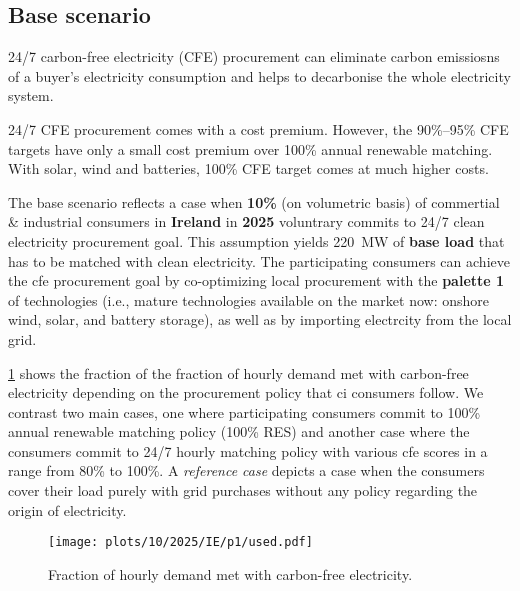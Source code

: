 \subsection{Base scenario}
\label{subsec:base}

\vspace{10pt}
\begin{res}
    24/7 carbon-free electricity (CFE) procurement can eliminate carbon emissiosns of a buyer's electricity consumption and helps to decarbonise the whole electricity system.
\end{res}

\vspace{5pt}
\begin{res}
    24/7 CFE procurement comes with a cost premium. 
    However, the 90\%--95\% CFE targets have only a small cost premium over 100\% annual renewable matching. 
    With solar, wind and batteries, 100\% CFE target comes at much higher costs.
\end{res}


The base scenario reflects a case when \textbf{10\%} (on volumetric basis) of commertial \& industrial consumers in \textbf{Ireland} in \textbf{2025} voluntrary commits to 24/7 clean electricity procurement goal.
This assumption yields 220~MW of \textbf{base load} that has to be matched with clean electricity. 
The participating consumers can achieve the \gls{cfe} procurement goal by co-optimizing local procurement with the \textbf{palette 1} of technologies (i.e., mature technologies available on the market now: onshore wind, solar, and battery storage), as well as by importing electrcity from the local grid.

\cref{fig:10-2025-IE-p1-used} shows the fraction of the fraction of hourly demand met with carbon-free electricity depending on the procurement policy that \gls{ci} consumers follow.
We contrast two main cases, one where participating consumers commit to 100\% annual renewable matching policy (100\% RES) and another case where the consumers commit to 24/7 hourly matching policy with various \gls{cfe} scores in a range from 80\% to 100\%. 
A \textit{reference case} depicts a case when the consumers cover their load purely with grid purchases without any policy regarding the origin of electricity.

\begin{figure}
    \centering
    \texttt{[image: plots/10/2025/IE/p1/used.pdf]}
    \caption{Fraction of hourly demand met with carbon-free electricity.}
    \label{fig:10-2025-IE-p1-used}
\end{figure}

